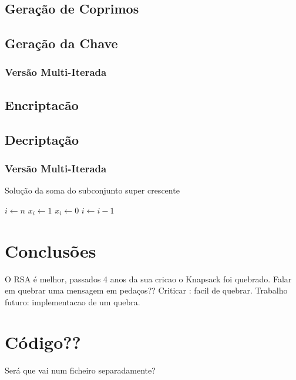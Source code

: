 \documentclass[11pt]{report}
\begin{document}
\section{Geração de Coprimos}

\section{Geração da Chave}

\subsection{Versão Multi-Iterada}

\section{Encriptacão}

\section{Decriptação}

\subsection{Versão Multi-Iterada}

\begin{algorithm}
	\caption{Solução da soma do subconjunto super crescente}
	\begin{algorithmic}[1]
		\State $i \gets n$
				\State $x_i \gets 1$
			\Else
				\State $x_i \gets 0 $
			\EndIf
		\State $i \gets i - 1$
		\EndWhile
\end{algorithmic}
\end{algorithm}


\chapter{Conclusões}

O RSA é melhor, passados 4 anos da sua cricao o Knapsack foi quebrado.
Falar em quebrar uma mensagem em pedaços?? 
Criticar : facil de quebrar.
Trabalho futuro: implementacao de um quebra.

\appendix

\chapter{Código??}

Será que vai num ficheiro separadamente?
\end{document}
